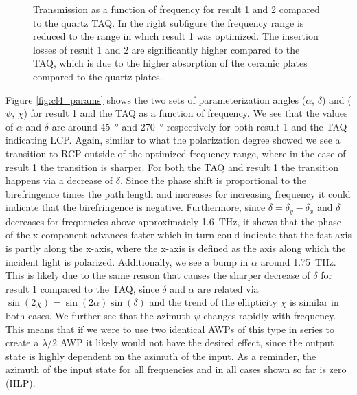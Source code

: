 \begin{figure}[ht]
    \centering
    
    \caption{Transmission as a function of frequency for result 1 and 2 compared to the quartz TAQ. In the right subfigure the frequency range is reduced to the range in which result 1 was optimized. The insertion losses of result 1 and 2 are significantly higher compared to the TAQ, which is due to the higher absorption of the ceramic plates compared to the quartz plates.}
    \label{fig:cl4_intensity}
\end{figure}

Figure \ref{fig:cl4_params} shows the two sets of parameterization angles ($\alpha$, $\delta$) and ($\psi$, $\chi$) for result 1 and the TAQ as a function of frequency. We see that the values of $\alpha$ and $\delta$ are around \SI{45}{\degree} and \SI{270}{\degree} respectively for both result 1 and the TAQ indicating LCP. Again, similar to what the polarization degree showed we see a transition to RCP outside of the optimized frequency range, where in the case of result 1 the transition is sharper. For both the TAQ and result 1 the transition happens via a decrease of $\delta$. Since the phase shift is proportional to the birefringence times the path length and increases for increasing frequency it could indicate that the birefringence is negative. Furthermore, since $\delta = \delta_y - \delta_x$ and $\delta$ decreases for frequencies above approximately \SI{1.6}{\tera \hertz}, it shows that the phase of the x-component advances faster which in turn could indicate that the fast axis is partly along the x-axis, where the x-axis is defined as the axis along which the incident light is polarized. Additionally, we see a bump in $\alpha$ around \SI{1.75}{\tera \hertz}. This is likely due to the same reason that causes the sharper decrease of $\delta$ for result 1 compared to the TAQ, since $\delta$ and $\alpha$ are related via $\sin(2\chi)=\sin(2\alpha)\sin(\delta)$ and the trend of the ellipticity $\chi$ is similar in both cases. We further see that the azimuth $\psi$ changes rapidly with frequency. This means that if we were to use two identical AWPs of this type in series to create a $\lambda/2$ AWP it likely would not have the desired effect, since the output state is highly dependent on the azimuth of the input. As a reminder, the azimuth of the input state for all frequencies and in all cases shown so far is zero (HLP).

